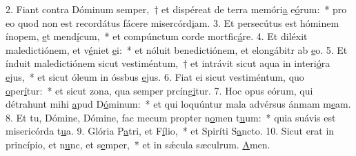 2. Fiant contra Dóminum semper,~† et dispéreat de terra memóri\uline{a} e\uline{ó}rum:~* pro eo quod non est recordátus fácere misercórd\uline{i}am.
3. Et persecútus est hóminem ínopem, \uline{e}t mend\uline{í}cum,~* et compúnctum corde mortfic\uline{á}re.
4. Et diléxit maledictiónem, et v\uline{é}niet \uline{e}i:~* et nóluit benedictiónem, et elongábitr ab \uline{e}o.
5. Et índuit maledictiónem sicut vestiméntum,~† et intrávit sicut aqua in interi\uline{ó}ra \uline{e}jus,~* et sicut óleum in óssbus \uline{e}jus.
6. Fiat ei sicut vestiméntum, quo \uline{o}per\uline{í}tur:~* et sicut zona, qua semper prcíng\uline{i}tur.
7. Hoc opus eórum, qui détrahunt mihi \uline{a}pud D\uline{ó}minum:~* et qui loquúntur mala advérsus ánmam m\uline{e}am.
8. Et tu, Dómine, Dómine, fac mecum propter n\uline{o}men t\uline{u}um:~* quia suávis est misericórda t\uline{u}a.
9. Glória P\uline{a}tri, et F\uline{í}lio,~* et Spiríti S\uline{a}ncto.
10. Sicut erat in princípio, et n\uline{u}nc, et s\uline{e}mper,~* et in sǽcula sæculrum. \uline{A}men.
